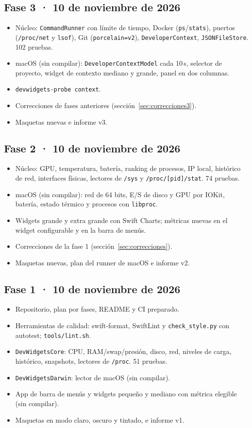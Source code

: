 \documentclass[11pt,a4paper]{article}
\begin{document}
\subsection*{Fase 3 · 10 de noviembre de 2026}
\begin{itemize}
  \item Núcleo: \texttt{CommandRunner} con límite de tiempo, Docker
    (\texttt{ps}/\texttt{stats}), puertos (\texttt{/proc/net} y
    \texttt{lsof}), Git (\texttt{porcelain=v2}),
    \texttt{DeveloperContext}, \texttt{JSONFileStore}. 102 pruebas.
  \item macOS (sin compilar): \texttt{DeveloperContextModel} cada
    10\,s, selector de proyecto, widget de contexto mediano y grande,
    panel en dos columnas.
  \item \texttt{devwidgets-probe context}.
  \item Correcciones de fases anteriores
    (sección~\ref{sec:correcciones3}).
  \item Maquetas nuevas e informe v3.
\end{itemize}

\subsection*{Fase 2 · 10 de noviembre de 2026}
\begin{itemize}
  \item Núcleo: GPU, temperatura, batería, ranking de procesos, IP
    local, histórico de red, interfaces físicas, lectores de
    \texttt{/sys} y \texttt{/proc/[pid]/stat}. 74 pruebas.
  \item macOS (sin compilar): red de 64 bits, E/S de disco y GPU por
    IOKit, batería, estado térmico y procesos con \texttt{libproc}.
  \item Widgets grande y extra grande con Swift Charts; métricas
    nuevas en el widget configurable y en la barra de menús.
  \item Correcciones de la fase 1 (sección~\ref{sec:correcciones}).
  \item Maquetas nuevas, plan del runner de macOS e informe v2.
\end{itemize}

\subsection*{Fase 1 · 10 de noviembre de 2026}
\begin{itemize}
  \item Repositorio, plan por fases, README y CI preparado.
  \item Herramientas de calidad: swift-format, SwiftLint y
    \texttt{check\_style.py} con autotest; \texttt{tools/lint.sh}.
  \item \texttt{DevWidgetsCore}: CPU, RAM/swap/presión, disco,
    red, niveles de carga, histórico, snapshots, lectores de
    \texttt{/proc}. 51 pruebas.
  \item \texttt{DevWidgetsDarwin}: lector de macOS (sin compilar).
  \item App de barra de menús y widgets pequeño y mediano con
    métrica elegible (sin compilar).
  \item Maquetas en modo claro, oscuro y tintado, e informe v1.
\end{itemize}
\end{document}
